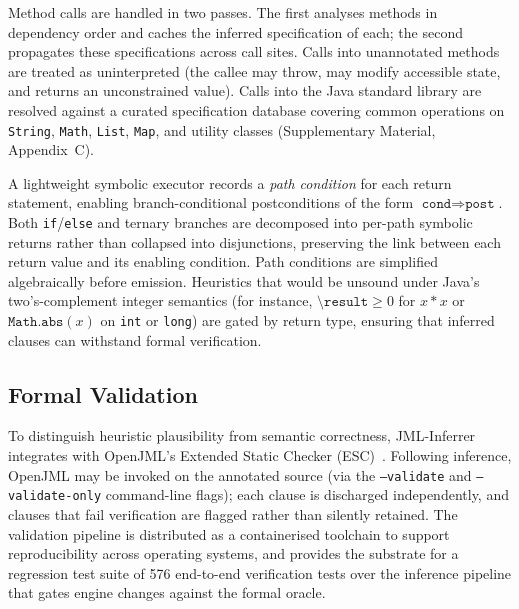 \documentclass[11pt]{article}
\begin{document}
Method calls are handled in two passes. The first analyses methods in dependency order and caches the inferred specification of each; the second propagates these specifications across call sites. Calls into unannotated methods are treated as uninterpreted (the callee may throw, may modify accessible state, and returns an unconstrained value). Calls into the Java standard library are resolved against a curated specification database covering common operations on \texttt{String}, \texttt{Math}, \texttt{List}, \texttt{Map}, and utility classes (Supplementary Material, Appendix~C).

A lightweight symbolic executor records a \emph{path condition} for each return statement, enabling branch-conditional postconditions of the form $\texttt{cond} \Longrightarrow \texttt{post}$. Both \texttt{if}/\texttt{else} and ternary branches are decomposed into per-path symbolic returns rather than collapsed into disjunctions, preserving the link between each return value and its enabling condition. Path conditions are simplified algebraically before emission. Heuristics that would be unsound under Java's two's-complement integer semantics (for instance, $\texttt{\textbackslash result} \ge 0$ for $x*x$ or $\texttt{Math.abs}(x)$ on \texttt{int} or \texttt{long}) are gated by return type, ensuring that inferred clauses can withstand formal verification.

\subsection{Formal Validation}
\label{subsec:validation}

To distinguish heuristic plausibility from semantic correctness, JML-Inferrer integrates with OpenJML's Extended Static Checker (ESC)~\cite{openjml}. Following inference, OpenJML may be invoked on the annotated source (via the \texttt{--validate} and \texttt{--validate-only} command-line flags); each clause is discharged independently, and clauses that fail verification are flagged rather than silently retained. The validation pipeline is distributed as a containerised toolchain to support reproducibility across operating systems, and provides the substrate for a regression test suite of 576 end-to-end verification tests over the inference pipeline that gates engine changes against the formal oracle.
\end{document}

